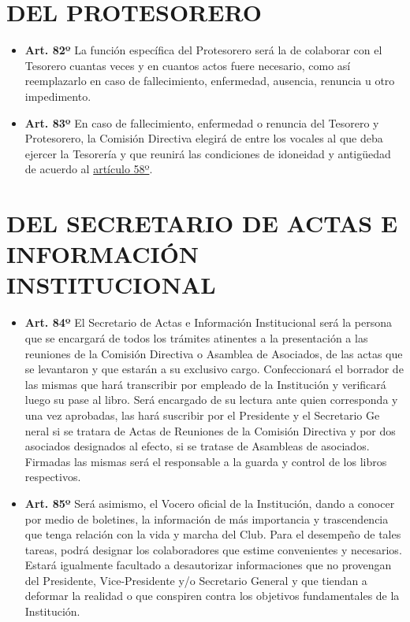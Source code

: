 \documentclass[]{book}
\begin{document}
\chapter{DEL PROTESORERO}\label{del-protesorero}

\begin{itemize}
\item
  \textbf{Art. 82º} La función específica del Protesorero será la de
  colaborar con el Tesorero cuantas veces y en cuantos actos fuere
  necesario, como así reemplazarlo en caso de fallecimiento, enfermedad,
  ausencia, renuncia u otro impedimento.
\item
  \textbf{Art. 83º} En caso de fallecimiento, enfermedad o renuncia del
  Tesorero y Protesorero, la Comisión Directiva elegirá de entre los
  vocales al que deba ejercer la Tesorería y que reunirá las condiciones
  de idoneidad y antigüedad de acuerdo al
  \protect\hyperlink{art58}{artículo 58º}.
\end{itemize}

\chapter{DEL SECRETARIO DE ACTAS E INFORMACIÓN
INSTITUCIONAL}\label{del-secretario-de-actas-e-informacion-institucional}

\begin{itemize}
\item
  \textbf{Art. 84º} El Secretario de Actas e Información Institucional
  será la persona que se encargará de todos los trámites atinentes a la
  presentación a las reuniones de la Comisión Directiva o Asamblea de
  Asociados, de las actas que se levantaron y que estarán a su exclusivo
  cargo. Confeccionará el borrador de las mismas que hará transcribir
  por empleado de la Institución y verificará luego su pase al libro.
  Será encargado de su lectura ante quien corresponda y una vez
  aprobadas, las hará suscribir por el Presidente y el Secretario Ge
  neral si se tratara de Actas de Reuniones de la Comisión Directiva y
  por dos asociados designados al efecto, si se tratase de Asambleas de
  asociados. Firmadas las mismas será el responsable a la guarda y
  control de los libros respectivos.
\item
  \textbf{Art. 85º} Será asimismo, el Vocero oficial de la Institución,
  dando a conocer por medio de boletines, la información de más
  importancia y trascendencia que tenga relación con la vida y marcha
  del Club. Para el desempeño de tales tareas, podrá designar los
  colaboradores que estime convenientes y necesarios. Estará igualmente
  facultado a desautorizar informaciones que no provengan del
  Presidente, Vice-Presidente y/o Secretario General y que tiendan a
  deformar la realidad o que conspiren contra los objetivos
  fundamentales de la Institución.
\end{itemize}
\end{document}
